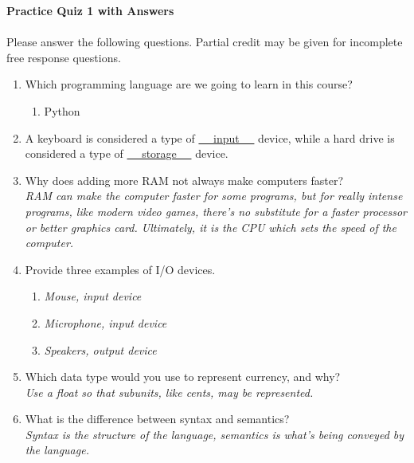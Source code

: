\documentclass[letter,10pt]{article}
\newcommand*\tick{\item[\Checkmark]}
\begin{document}
\huge
\textbf{Practice Quiz 1 with Answers}
\normalsize

\paragraph{}Please answer the following questions. Partial credit may be given for incomplete free response questions.

\begin{enumerate}
    \item Which programming language are we going to learn in this course?
    \begin{enumerate}
        \tick Python
    \end{enumerate}
    
    \item A keyboard is considered a type of \underline{~~ input ~~} device, while a hard drive is considered a type of \underline{~~ storage ~~} device.
    
    \item Why does adding more RAM not always make computers faster? \\
    \textit{RAM can make the computer faster for some programs, but for really intense programs, like modern video games, there's no substitute for a faster processor or better graphics card. Ultimately, it is the CPU which sets the speed of the computer.}
    
    \item Provide three examples of I/O devices.
    \begin{enumerate}
        \item \textit{Mouse, input device}
        \item \textit{Microphone, input device}
        \item \textit{Speakers, output device}
    \end{enumerate}
    
    \item Which data type would you use to represent currency, and why? \\
    \textit{Use a float so that subunits, like cents, may be represented.}
    
    \item What is the difference between syntax and semantics? \\
    \textit{Syntax is the structure of the language, semantics is what's being conveyed by the language.}
    

\end{enumerate}
\end{document}
